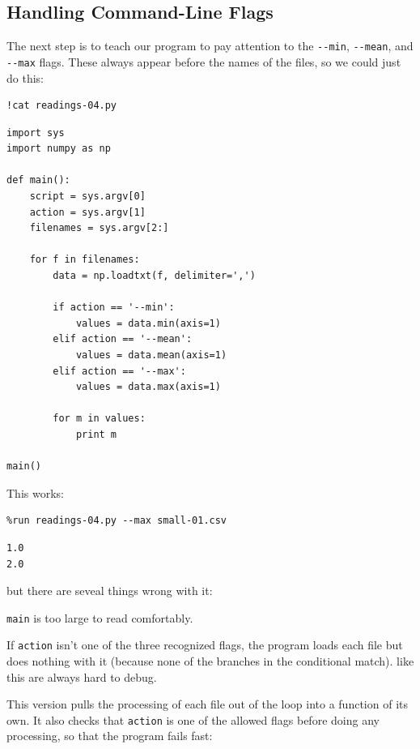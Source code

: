 \documentclass{book}
\begin{document}
\subsection{Handling Command-Line Flags}

The next step is to teach our program to pay attention to the
\texttt{-{}-min}, \texttt{-{}-mean}, and \texttt{-{}-max} flags. These
always appear before the names of the files, so we could just do this:

\begin{verbatim}
!cat readings-04.py
\end{verbatim}

\begin{verbatim}
import sys
import numpy as np

def main():
    script = sys.argv[0]
    action = sys.argv[1]
    filenames = sys.argv[2:]

    for f in filenames:
        data = np.loadtxt(f, delimiter=',')

        if action == '--min':
            values = data.min(axis=1)
        elif action == '--mean':
            values = data.mean(axis=1)
        elif action == '--max':
            values = data.max(axis=1)

        for m in values:
            print m

main()
\end{verbatim}

This works:

\begin{verbatim}
%run readings-04.py --max small-01.csv
\end{verbatim}

\begin{verbatim}
1.0
2.0
\end{verbatim}

but there are seveal things wrong with it:

\begin{swcenumerate}
\item
  \texttt{main} is too large to read comfortably.
\item
  If \texttt{action} isn't one of the three recognized flags, the
  program loads each file but does nothing with it (because none of the
  branches in the conditional match).  like this are always hard to debug.
\end{swcenumerate}

This version pulls the processing of each file out of the loop into a
function of its own. It also checks that \texttt{action} is one of the
allowed flags before doing any processing, so that the program fails
fast:
\end{document}

